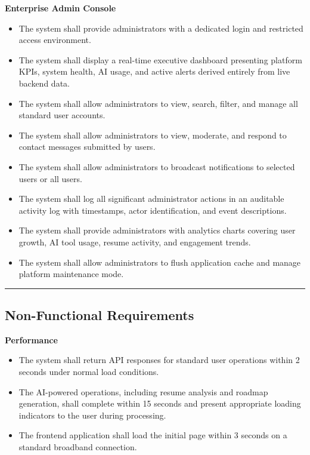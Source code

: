 \documentclass[12pt]{article}
\begin{document}
\textbf{Enterprise Admin Console}

\begin{itemize}
  \item The system shall provide administrators with a dedicated login and restricted access environment.
  \item The system shall display a real-time executive dashboard presenting platform KPIs, system health, AI usage, and active alerts derived entirely from live backend data.
  \item The system shall allow administrators to view, search, filter, and manage all standard user accounts.
  \item The system shall allow administrators to view, moderate, and respond to contact messages submitted by users.
  \item The system shall allow administrators to broadcast notifications to selected users or all users.
  \item The system shall log all significant administrator actions in an auditable activity log with timestamps, actor identification, and event descriptions.
  \item The system shall provide administrators with analytics charts covering user growth, AI tool usage, resume activity, and engagement trends.
  \item The system shall allow administrators to flush application cache and manage platform maintenance mode.
\end{itemize}

\noindent\rule{\textwidth}{0.4pt}

\subsection{Non-Functional Requirements}

\textbf{Performance}

\begin{itemize}
  \item The system shall return API responses for standard user operations within 2 seconds under normal load conditions.
  \item The AI-powered operations, including resume analysis and roadmap generation, shall complete within 15 seconds and present appropriate loading indicators to the user during processing.
  \item The frontend application shall load the initial page within 3 seconds on a standard broadband connection.
\end{itemize}
\end{document}
